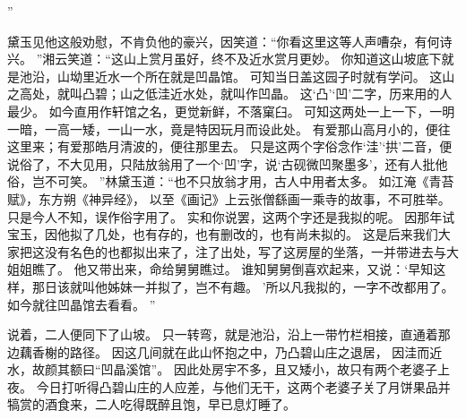 ”\par
黛玉见他这般劝慰，不肯负他的豪兴，因笑道：“你看这里这等人声嘈杂，有何诗兴。
”湘云笑道：“这山上赏月虽好，终不及近水赏月更妙。
你知道这山坡底下就是池沿，山坳里近水一个所在就是凹晶馆。
可知当日盖这园子时就有学问。
这山之高处，就叫凸碧；山之低洼近水处，就叫作凹晶。
这‘凸’‘凹’二字，历来用的人最少。
如今直用作轩馆之名，更觉新鲜，不落窠臼。
可知这两处一上一下，一明一暗，一高一矮，一山一水，竟是特因玩月而设此处。
有爱那山高月小的，便往这里来；有爱那皓月清波的，便往那里去。
只是这两个字俗念作‘洼’‘拱’二音，便说俗了，不大见用，只陆放翁用了一个‘凹’字，说‘古砚微凹聚墨多’，还有人批他俗，岂不可笑。
”林黛玉道：“也不只放翁才用，古人中用者太多。
如江淹《青苔赋》，东方朔《神异经》，
以至《画记》上云张僧繇画一乘寺的故事，不可胜举。
只是今人不知，误作俗字用了。
实和你说罢，这两个字还是我拟的呢。
因那年试宝玉，因他拟了几处，也有存的，也有删改的，也有尚未拟的。
这是后来我们大家把这没有名色的也都拟出来了，注了出处，写了这房屋的坐落，一并带进去与大姐姐瞧了。
他又带出来，命给舅舅瞧过。
谁知舅舅倒喜欢起来，又说：‘早知这样，那日该就叫他姊妹一并拟了，岂不有趣。
’所以凡我拟的，一字不改都用了。
如今就往凹晶馆去看看。
”\par
说着，二人便同下了山坡。
只一转弯，就是池沿，沿上一带竹栏相接，直通着那边藕香榭的路径。
因这几间就在此山怀抱之中，乃凸碧山庄之退居，
因洼而近水，故颜其额曰“凹晶溪馆”。
因此处房宇不多，且又矮小，故只有两个老婆子上夜。
今日打听得凸碧山庄的人应差，与他们无干，这两个老婆子关了月饼果品并犒赏的酒食来，二人吃得既醉且饱，早已息灯睡了。
\par
